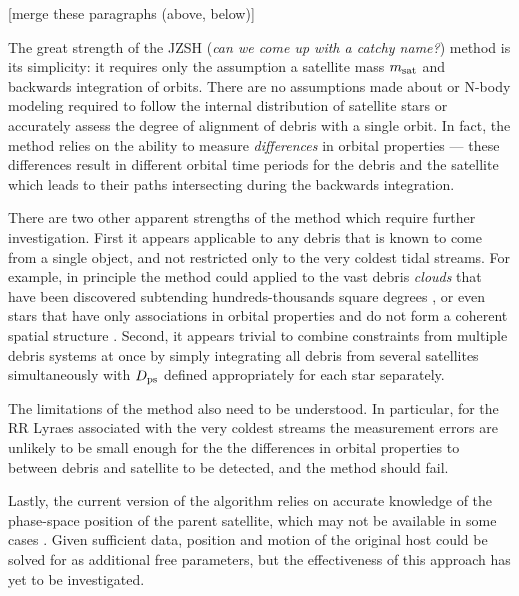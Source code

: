 \documentclass[preprint]{aastex}
\begin{document}
[merge these paragraphs (above, below)]

The great strength of the  JZSH ({\it can we come up with a catchy name?}) method is its simplicity:
it requires only the assumption a satellite mass $m_{\rm sat}$ and  backwards integration of orbits.
There are no assumptions made about or N-body modeling required to follow the internal distribution of satellite stars or accurately assess the degree of alignment of
debris with a single orbit.
In fact, the method relies on the ability to measure {\it differences} in orbital properties --- these differences result in different orbital time periods for the debris and the
satellite which leads to their paths intersecting during the backwards integration.

There are two other apparent strengths of the method which require further investigation.
First it appears applicable to any debris that is known to come from a single object, and not restricted only to the very coldest tidal streams. For example, in principle the
method could  applied to the vast debris {\it clouds} that have been discovered subtending hundreds-thousands square degrees \citep[e.g. the Triangulum Andromeda
and Hercules-Aquila clouds]{rochapinto04,belokurov06}, or even stars that have only associations in orbital properties and do not form a coherent spatial structure
\citep[such as the angular momentum groupings in local giants found by][]{helmi99}.
Second, it appears trivial to combine constraints from multiple debris systems at once by simply integrating all debris from several satellites simultaneously with $D_{\rm
ps}$ defined appropriately for each star separately.

The limitations of the method also need to be understood. In particular, for the RR Lyraes associated with  the very coldest streams \citep[e.g. the globular clusters Pal5
and GD1][]{odenkirchen02,koposov10} the measurement errors are unlikely to be small enough for the
the differences in orbital properties to between debris and satellite to be detected, and the method should fail.

Lastly, the current version of the algorithm relies on accurate knowledge of the phase-space position of the parent satellite, which may not be available in some cases
\citep[for example, for the Orphan Stream][]{belokurov07}. Given sufficient data, position and motion of the original host could be solved for as additional free parameters,
but the effectiveness of this approach has yet to be investigated.
\end{document}
